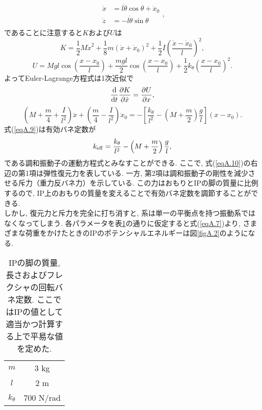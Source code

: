 \begin{equation}
\begin{split}
\dot{x}&=l\dot{\theta}\cos\theta+\dot{x}_0\\
\dot{z}&=-l\dot{\theta}\sin\theta\\
\end{split},
\end{equation}
であることに注意すると$K$および$U$は
\begin{equation}
K=\frac{1}{2}M\dot{x}^2+\frac{1}{8}m\left(\dot{x}+\dot{x}_0\right)^2+\frac{1}{2}I\left(\frac{\dot{x}-\dot{x}_0}{l}\right)^2,
\end{equation}
\begin{equation}
U=Mgl\cos\left(\frac{x-x_0}{l}\right)+\frac{mgl}{2}\cos\left(\frac{x-x_0}{l}\right)+\frac{1}{2}k_{\theta}\left(\frac{x-x_0}{l}\right)^2.
\label{eqA.7}
\end{equation}
よってEuler-Lagrange方程式は1次近似で
\begin{equation}
\frac{{\rm d}}{{\rm d}t}\frac{\partial K}{\partial\dot{x}}=\frac{\partial U}{\partial x},
\end{equation}
\begin{equation}
\left(M+\frac{m}{4}+\frac{I}{l^2}\right)\ddot{x}+\left(\frac{m}{4}-\frac{I}{l^2}\right)\ddot{x}_0=-\left[\frac{k_{\theta}}{l^2}-\left(M+\frac{m}{2}\right)\frac{g}{l}\right](x-x_0).
\label{eqA.9}
\end{equation}
式(\ref{eqA.9})は有効バネ定数が
\begin{equation}
k_{\rm eff}=\frac{k_{\theta}}{l^2}-\left(M+\frac{m}{2}\right)\frac{g}{l},
\label{eqA.10}
\end{equation}
である調和振動子の運動方程式とみなすことができる. ここで, 式(\ref{eqA.10})の右辺の第1項は弾性復元力を表している.  一方, 第2項は調和振動子の剛性を減少させる斥力（重力反バネ力）を示している. この力はおもりとIPの脚の質量に比例するので, IP上のおもりの質量を変えることで有効バネ定数を調節することができる. \\
\quad しかし, 復元力と斥力を完全に打ち消すと, 系は単一の平衡点を持つ振動系ではなくなってしまう. 各パラメータを表\ref{tableA.1}の通りに仮定すると式(\ref{eqA.7})より, さまざまな荷重をかけたときのIPのポテンシャルエネルギーは図\ref{figA.2}のようになる. 
\begin{table}[H]
 \centering
  \begin{tabular}{cc}
   \hline\hline
   $m$ & 3 kg \\
   $l$ & 2 m \\
   $k_{\theta}$ & 700 N/rad \\
   \hline
  \end{tabular}
 \caption[IPの脚の質量, 長さおよびフレクシャの回転バネ定数]{IPの脚の質量, 長さおよびフレクシャの回転バネ定数. ここではIPの値として適当かつ計算する上で平易な値を定めた. }
 \label{tableA.1}
\end{table}
